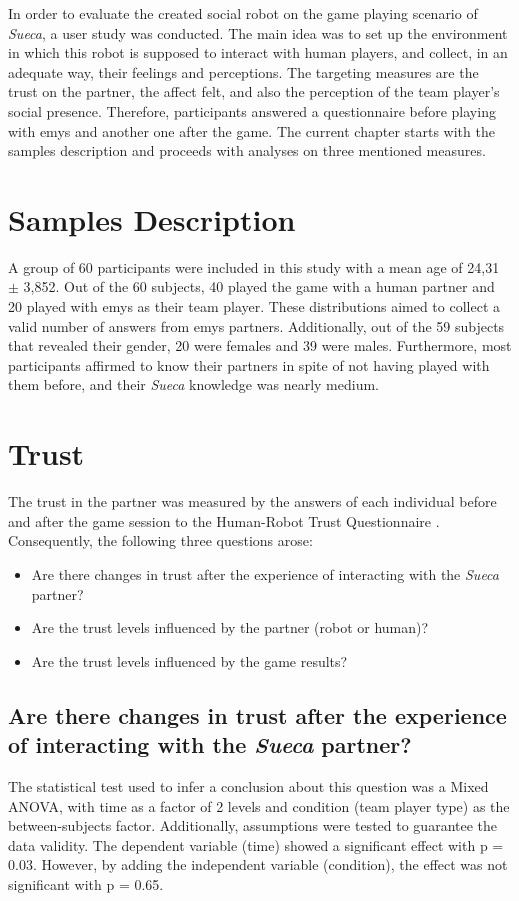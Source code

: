 \label{chapter:results}

In order to evaluate the created social robot on the game playing scenario of \emph{Sueca}, a user study was conducted.
The main idea was to set up the environment in which this robot is supposed to interact with human players, and collect, in an adequate way, their feelings and perceptions.
The targeting measures are the trust on the partner, the affect felt, and also the perception of the team player's social presence.
Therefore, participants answered a questionnaire before playing with \ac{emys} and another one after the game.
The current chapter starts with the samples description and proceeds with analyses on three mentioned measures.


\section{Samples Description}
\label{sec:samples}
A group of 60 participants were included in this study with a mean age of 24,31 $\pm$ 3,852.
Out of the 60 subjects, 40 played the game with a human partner and 20 played with \ac{emys} as their team player.
These distributions aimed to collect a valid number of answers from \ac{emys} partners.
Additionally, out of the 59 subjects that revealed their gender, 20 were females and 39 were males.
Furthermore, most participants affirmed to know their partners in spite of not having played with them before, and their \emph{Sueca} knowledge was nearly medium.

\section{Trust}
\label{sec:trust}
The trust in the partner was measured by the answers of each individual before and after the game session to the Human-Robot Trust Questionnaire \cite{Schaefer2013}.
Consequently, the following three questions arose:
\begin{itemize}
\item Are there changes in trust after the experience of interacting with the \emph{Sueca} partner?
\item Are the trust levels influenced by the partner (robot or human)?
\item Are the trust levels influenced by the game results?
\end{itemize}


\subsection*{Are there changes in trust after the experience of interacting with the \emph{Sueca} partner?}
The statistical test used to infer a conclusion about this question was a Mixed ANOVA, with time as a factor of 2 levels and condition (team player type) as the between-subjects factor.
Additionally, assumptions were tested to guarantee the data validity.
The dependent variable (time) showed a significant effect with p = 0.03.
However, by adding the independent variable (condition), the effect was not significant with p = 0.65.

